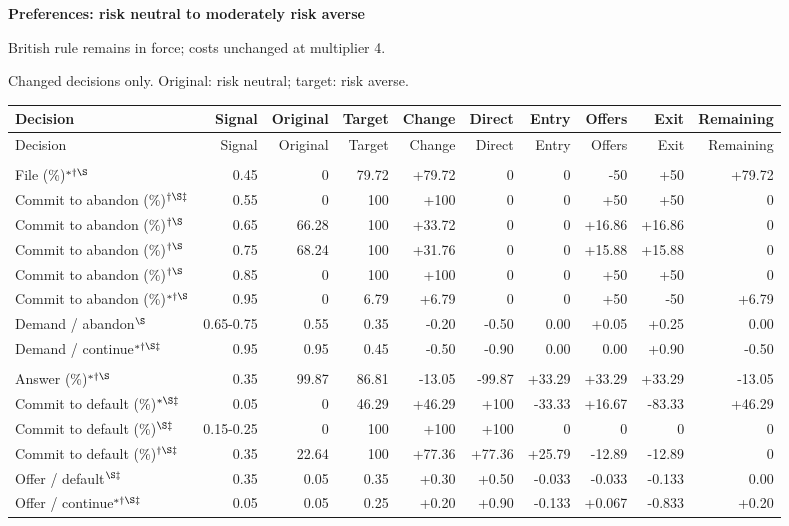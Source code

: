 \documentclass[10pt]{article}
\begin{document}
{\large\bfseries Preferences: risk neutral to moderately risk averse}\par
British rule remains in force; costs unchanged at multiplier 4.\par
{\small Changed decisions only. Original: risk neutral; target: risk averse.}\par
{\small\setlength{\tabcolsep}{3pt}\begin{longtable}{@{}>{\raggedright\arraybackslash}p{1.65in}rrrrrrrrr@{}}
\toprule Decision & Signal & Original & Target & Change & Direct & Entry & Offers & Exit & Remaining \\\midrule\endfirsthead
\toprule Decision & Signal & Original & Target & Change & Direct & Entry & Offers & Exit & Remaining \\\midrule\endhead
\bottomrule\endfoot
\multicolumn{10}{@{}l}{\textbf{Plaintiff}}\\
File (\%)$^{*\dagger\S}$ & 0.45 & 0 & 79.72 & +79.72 & 0 & 0 & -50 & +50 & +79.72\\
Commit to abandon (\%)$^{\dagger\S\ddagger}$ & 0.55 & 0 & 100 & +100 & 0 & 0 & +50 & +50 & 0\\
Commit to abandon (\%)$^{\dagger\S}$ & 0.65 & 66.28 & 100 & +33.72 & 0 & 0 & +16.86 & +16.86 & 0\\
Commit to abandon (\%)$^{\dagger\S}$ & 0.75 & 68.24 & 100 & +31.76 & 0 & 0 & +15.88 & +15.88 & 0\\
Commit to abandon (\%)$^{\dagger\S}$ & 0.85 & 0 & 100 & +100 & 0 & 0 & +50 & +50 & 0\\
Commit to abandon (\%)$^{*\dagger\S}$ & 0.95 & 0 & 6.79 & +6.79 & 0 & 0 & +50 & -50 & +6.79\\
Demand / abandon$^{\S}$ & 0.65-0.75 & 0.55 & 0.35 & -0.20 & -0.50 & 0.00 & +0.05 & +0.25 & 0.00\\
Demand / continue$^{*\dagger\S\ddagger}$ & 0.95 & 0.95 & 0.45 & -0.50 & -0.90 & 0.00 & 0.00 & +0.90 & -0.50\\
\multicolumn{10}{@{}l}{\textbf{Defendant}}\\
Answer (\%)$^{*\dagger\S}$ & 0.35 & 99.87 & 86.81 & -13.05 & -99.87 & +33.29 & +33.29 & +33.29 & -13.05\\
Commit to default (\%)$^{*\S\ddagger}$ & 0.05 & 0 & 46.29 & +46.29 & +100 & -33.33 & +16.67 & -83.33 & +46.29\\
Commit to default (\%)$^{\S\ddagger}$ & 0.15-0.25 & 0 & 100 & +100 & +100 & 0 & 0 & 0 & 0\\
Commit to default (\%)$^{\dagger\S\ddagger}$ & 0.35 & 22.64 & 100 & +77.36 & +77.36 & +25.79 & -12.89 & -12.89 & 0\\
Offer / default$^{\S\ddagger}$ & 0.35 & 0.05 & 0.35 & +0.30 & +0.50 & -0.033 & -0.033 & -0.133 & 0.00\\
Offer / continue$^{*\dagger\S\ddagger}$ & 0.05 & 0.05 & 0.25 & +0.20 & +0.90 & -0.133 & +0.067 & -0.833 & +0.20\\
\end{longtable}}
\end{document}
